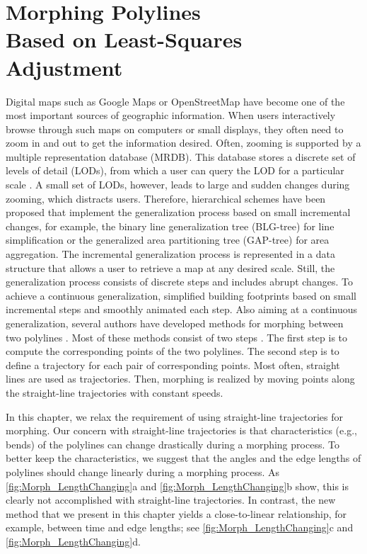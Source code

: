 \chapter %
[Morphing Polylines Based on Least-Squares Adjustment]
{Morphing Polylines\\ Based on Least-Squares Adjustment}
\label{chap:Morph}


Digital maps such as Google Maps or OpenStreetMap have become 
one of the most important sources of geographic information. 
When users interactively browse through such maps on computers 
or small displays, they often need to zoom in and out to get the 
information desired. Often, zooming is supported by a multiple 
representation database (MRDB). 
This database stores a discrete set of levels of detail (LODs), 
from which a user can query the LOD for a 
particular scale \parencite{Hampe2004multiple}. 
A small set of LODs, however, leads to 
large and sudden changes during zooming, 
which distracts users.
Therefore, hierarchical schemes have been proposed that 
implement the generalization process 
based on small incremental changes, 
for example, the binary line generalization tree 
(BLG-tree) \parencite{vanOosterom2005} 
for line simplification 
or the generalized area partitioning tree (GAP-tree)
\parencite{vanOosterom1995GAPTree} 
for area aggregation. 
The incremental generalization process is 
represented in a data structure 
that allows a user to retrieve a map at any desired scale. 
Still, the generalization process 
consists of discrete steps and includes abrupt changes. 
To achieve a continuous generalization, 
\textcite{Sester2004} simplified building footprints 
based on small incremental steps 
and smoothly animated each step. 
Also aiming at a continuous generalization, 
several authors have developed 
methods for morphing between two polylines
\parencite{Cecconi2003,Noellenburg2008}. 
Most of these methods consist of two steps 
\parencite{Cecconi2003,Noellenburg2008,Peng2012River}. 
The first step is to compute the corresponding points
of the two polylines. 
The second step is to define a trajectory for each 
pair of corresponding points. 
Most often, straight lines are used as trajectories.
Then, morphing is realized by moving points 
along the straight-line trajectories with constant speeds.

In this chapter, we relax the requirement of using
straight-line trajectories for morphing.
Our concern with straight-line trajectories is that 
characteristics (e.g., bends) of the polylines 
can change drastically during a morphing process. 
To better keep the characteristics, 
we suggest that the angles and the edge lengths of polylines 
should change linearly during a morphing process. 
As \figs\ref{fig:Morph_LengthChanging}a and 
\ref{fig:Morph_LengthChanging}b show, this is clearly 
not accomplished with straight-line trajectories. In contrast, 
the new method that we present in this chapter yields a 
close-to-linear relationship, for example, between time and edge 
lengths; see \figs\ref{fig:Morph_LengthChanging}c and 
\ref{fig:Morph_LengthChanging}d.

